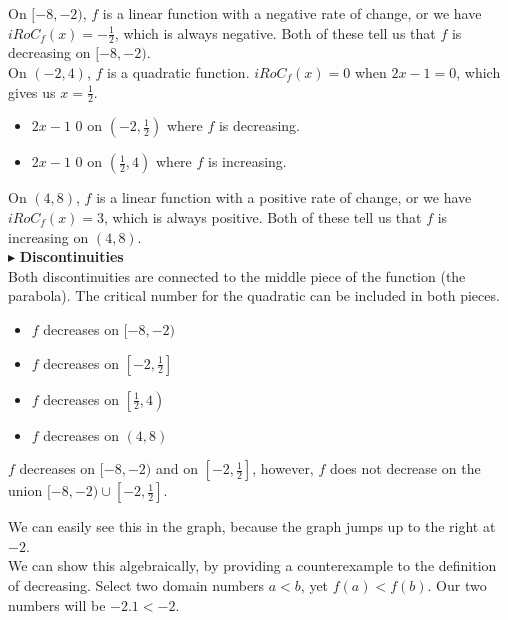 \documentclass{ximera}
\begin{document}
\begin{exercise}
\begin{question}
On $[-8, -2)$, $f$ is a linear function with a negative rate of change, or we have $iRoC_f(x) = -\frac{1}{2}$, which is always negative.  Both of these tell us that $f$ is decreasing on $[-8, -2)$. \\


On $(-2, 4)$, $f$ is a quadratic function.  $iRoC_f(x) = 0$ when $2x - 1 = 0$, which gives us $x = \frac{1}{2}$.


\begin{itemize}
\item $2x - 1$ \wordChoice{\choice[correct]{$<$} \choice{$>$}}  $0$ on  $\left( -2, \frac{1}{2}  \right)$ where $f$ is decreasing.
\item $2x - 1$ \wordChoice{\choice{$<$} \choice[correct]{$>$}}  $0$ on  $\left( \frac{1}{2}, 4 \right)$ where $f$ is increasing.
\end{itemize}

On $(4, 8)$, $f$ is a linear function with a positive rate of change, or we have $iRoC_f(x) = 3$, which is always positive.  Both of these tell us that $f$ is increasing on $(4, 8)$. \\




$\blacktriangleright$ \textbf{Discontinuities} \\


Both discontinuities are connected to the middle piece of the function (the parabola). The critical number for the quadratic can be included in both pieces.



\begin{itemize}
\item $f$ decreases on $[-8, -2)$
\item $f$ decreases on $\left[ -2, \frac{1}{2}  \right]$
\item $f$ decreases on $\left[ \frac{1}{2}, 4 \right)$
\item $f$ decreases on $(4, 8)$
\end{itemize}

\begin{warning}


$f$ decreases on $[-8, -2)$ and on $\left[ -2, \frac{1}{2}  \right]$, however, $f$ does not decrease on the union $[-8, -2) \cup \left[ -2, \frac{1}{2}  \right]$.

We can easily see this in the graph, because the graph jumps up to the right at $-2$. \\

We can show this algebraically, by providing a counterexample to the definition of decreasing. Select two domain numbers $a < b$, yet $f(a) < f(b)$.  Our two numbers will be $-2.1 < -2$.



\end{warning}
\end{question}
\end{exercise}
\end{document}
